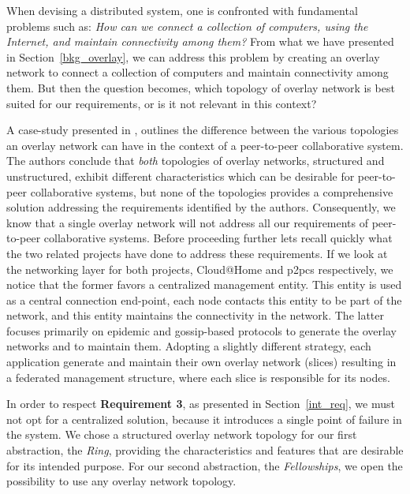 \documentclass[12pt, titlepage]{uo_temp}
\begin{document}
     When devising a distributed system, one is confronted with fundamental problems such
     as: \emph{How can we connect a collection of computers, using the Internet, and
       maintain connectivity among them?} From what we have presented in
     Section~\ref{bkg_overlay}, we can address this problem by creating an overlay network
     to connect a collection of computers and maintain connectivity among them. But then
     the question becomes, which topology of overlay network is best suited for our
     requirements, or is it not relevant in this context?

     A case-study presented in \cite{p2p_collab}, outlines the difference between the
     various topologies an overlay network can have in the context of a peer-to-peer
     collaborative system. The authors conclude that \emph{both} topologies of overlay
     networks, structured and unstructured, exhibit different characteristics which can
     be desirable for peer-to-peer collaborative systems, but none of the topologies
     provides a comprehensive solution addressing the requirements identified
     by the authors. Consequently, we know that a single overlay network will not address
     all our requirements of peer-to-peer collaborative systems. Before
     proceeding further lets recall quickly what the two related projects have done to address
     these requirements. If we look at the networking layer for both projects, Cloud@Home
     and \gls{p2pcs} respectively, we notice that the former favors a centralized
     management entity. This entity is used as a central connection end-point, each node
     contacts this entity to be part of the network, and this entity maintains the
     connectivity in the network. The latter focuses primarily on epidemic and
     gossip-based protocols to generate the overlay networks and to maintain
     them. Adopting a slightly different strategy, each application generate and maintain
     their own overlay network (slices) resulting in a federated management structure,
     where each slice is responsible for its nodes.

     In order to respect \textbf{Requirement 3}, as presented in Section~\ref{int_req}, we
     must not opt for a centralized solution, because it introduces a single point of
     failure in the system. We chose a structured overlay network topology for our first
     abstraction, the \emph{Ring}, providing the characteristics and features that are
     desirable for its intended purpose. For our second abstraction, the
     \emph{Fellowships}, we open the possibility to use any overlay network topology.
\end{document}
